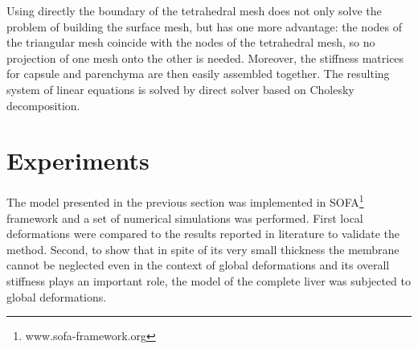 \documentclass{llncs}
\newcommand{\CD}[1]{{\color{green}\textbf{CD: #1}}}
\newcommand{\Mat}[1]{\mathbf{#1}}
\begin{document}
Using directly the boundary of the tetrahedral mesh does not only solve the
problem of building the surface mesh, but has one more advantage: the nodes
of the triangular mesh coincide with the nodes of the tetrahedral mesh, so no projection of one mesh onto the other is needed.
Moreover, the stiffness matrices for capsule and parenchyma are then easily assembled
together.%
%
The resulting system of linear equations is solved by direct solver based on Cholesky decomposition.




\section{Experiments} %
The model presented in the previous section was implemented in 
SOFA\footnote{www.sofa-framework.org} framework and a set of
numerical simulations was performed. First local deformations were compared to the
results reported in literature to validate the method.
Second, to show that in spite of its very small thickness the membrane cannot be
neglected even in the context of global deformations and its overall
stiffness plays an important role, the model of
the complete liver was subjected to global deformations.
\end{document}
